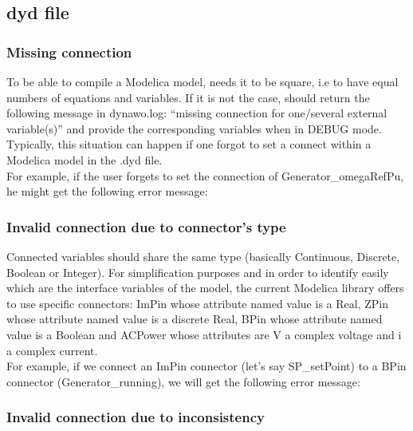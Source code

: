 \documentclass[a4paper, 12pt]{report}
\begin{document}
\subsection{dyd file}

\subsubsection{Missing connection}

To be able to compile a Modelica model, \Dynawo needs it to be square, i.e to have equal numbers of equations and variables. If it is not the case, \Dynawo should return the following message in dynawo.log: ``missing connection for one/several external variable(s)'' and provide the corresponding variables when in DEBUG mode. Typically, this situation can happen if one forgot to set a connect within a Modelica model in the .dyd file. \\

For example, if the user forgets to set the connection of Generator\_omegaRefPu, he might get the following error message:



\subsubsection{Invalid connection due to connector's type}

Connected variables should share the same type (basically  Continuous, Discrete, Boolean or Integer). For simplification purposes and in order to identify easily which are the interface variables of the model, the current \Dynawo Modelica library offers to use specific connectors: ImPin whose attribute named value is a Real, ZPin whose attribute named value is a discrete Real, BPin whose attribute named value is a Boolean and ACPower whose attributes are V a complex voltage and i a complex current. \\

For example, if we connect an ImPin connector (let's say SP\_setPoint) to a BPin connector (Generator\_running), we will get the following error message:



\subsubsection{Invalid connection due to inconsistency}
\end{document}
